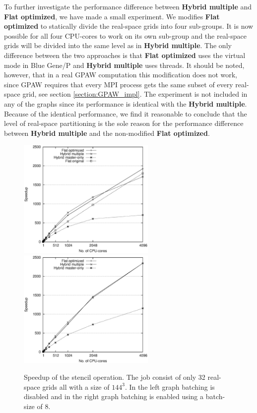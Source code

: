 \documentclass[preprint,3p,times,twocolumn]{elsarticle}
\begin{document}
To further investigate the performance difference between \textbf{Hybrid multiple} and \textbf{Flat optimized}, we have made a small experiment. We modifies \textbf{Flat optimized} to statically divide the real-space grids into four sub-groups. It is now possible for all four CPU-cores to work on its own sub-group and the real-space grids will be divided into the same level as in \textbf{Hybrid multiple}. The only difference between the two approaches is that \textbf{Flat optimized} uses the virtual mode in Blue Gene/P and \textbf{Hybrid multiple} uses threads.
It should be noted, however, that in a real GPAW computation this modification does not work, since GPAW requires that every MPI process gets the same subset of every real-space grid, see section \ref{section:GPAW_impl}.
The experiment is not included in any of the graphs since its performance is identical with the \textbf{Hybrid multiple}. Because of the identical performance, we find it reasonable to conclude that the level of real-space partitioning is the sole reason for the performance difference between \textbf{Hybrid multiple} and the non-modified \textbf{Flat optimized}.

\begin{figure}
\centerline{
\mbox{\includegraphics[width=250px]{gfx/fidi_speedup}}
\mbox{\includegraphics[width=250px]{gfx/fidi_batchspeedup}}
} 
 \caption{Speedup of the stencil operation. The job consist of only 32 real-space grids all with a size of $144^3$. In the left graph batching is disabled and in the right graph batching is enabled using a batch-size of 8.}
 \label{fig:speedup}
\end{figure}
\end{document}
